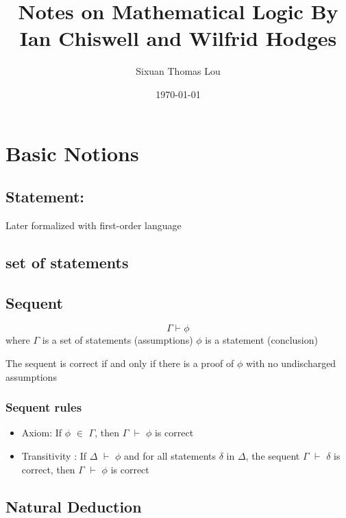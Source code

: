 \documentclass[11pt]{article}
\author{Sixuan Thomas Lou}
\date{\today}
\title{Notes on Mathematical Logic By Ian Chiswell and Wilfrid Hodges}
\begin{document}
\maketitle
\tableofcontents

\newpage

\section{Basic Notions}
\label{sec:orgheadline25}
\subsection{Statement:}
\label{sec:orgheadline1}

Later formalized with first-order language

\subsection{set of statements}
\label{sec:orgheadline2}


\subsection{Sequent}
\label{sec:orgheadline4}

\[\Gamma \vdash \phi\]
  where \(\Gamma\) is a set of statements (assumptions)
        \(\phi\)   is a statement (conclusion)


The sequent is correct if and only if there is a proof of \(\phi\)
with no undischarged assumptions

\subsubsection{Sequent rules}
\label{sec:orgheadline3}

\begin{itemize}
\item Axiom:         If \(\phi\) \(\in\) \(\Gamma\), then \(\Gamma\) \(\vdash\) \(\phi\) is correct
\item Transitivity : If \(\Delta\) \(\vdash\) \(\phi\) and for all statements \(\delta\) in \(\Delta\),
the sequent \(\Gamma\) \(\vdash\) \(\delta\) is correct,
then \(\Gamma\) \(\vdash\) \(\phi\) is correct
\end{itemize}


\subsection{Natural Deduction}
\label{sec:orgheadline6}
\end{document}

